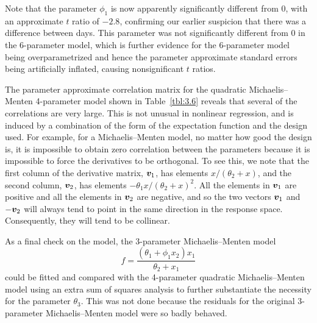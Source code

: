 Note that the parameter $\phi_{1}$ is now apparently
significantly different from 0, with an approximate
$t$ ratio of $-2.8$, confirming our earlier
suspicion that there was a difference between days.
This parameter was not significantly different from 0 in the
6-parameter model, which is further evidence for the 6-parameter
model being overparametrized and hence the parameter
approximate standard errors being artificially inflated, causing
nonsignificant $t$ ratios.

The parameter approximate correlation matrix for the quadratic
Michaelis--Menten 4-parameter model shown in
Table~\ref{tbl:3.6}
reveals that several of the correlations are very large.
This is not unusual in nonlinear regression, and is induced by a
combination of the form of the expectation function and the
design used.
For example, for a Michaelis--Menten model, no matter how good the
design is, it is impossible to obtain zero correlation between
the parameters because it is impossible to force the derivatives
to be orthogonal.
To see this, we note that the first column of
the derivative matrix, ${\boldsymbol v}_{1}$, has elements
$x /( \theta_2 + x)$, and the second column,
${\boldsymbol v}_{2}$, has elements
${- \theta_1 x} / ( \theta_2 + x )^{2}$.
All the elements in ${\boldsymbol v}_{1}$ are positive and all the
elements in ${\boldsymbol v}_{2}$ are negative, and so the two vectors
${\boldsymbol v}_{1}$ and
$ - {\boldsymbol v}_{2}$ will always tend to point in the same
direction in the response space.
Consequently, they will tend to be collinear.

As a final check on the model, the 3-parameter Michaelis--Menten
model
\begin{displaymath}
  f=\frac{(\theta_1+\phi_1x_2)x_1}{\theta_2+x_1}
\end{displaymath}
could be fitted and compared with the
4-parameter quadratic Michaelis--Menten model using an extra sum of
squares analysis to further substantiate the necessity for the parameter
$\theta_{3}$.
This was not done because the residuals for the original 3-parameter
Michaelis--Menten model were so badly behaved.

